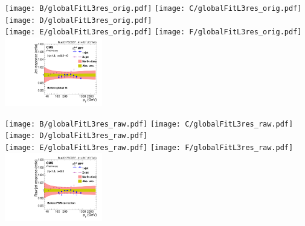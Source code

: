 \documentclass[landscape,10pt]{beamer} %
\begin{document}
\newpage

\texttt{[image: B/globalFitL3res\_orig.pdf]}
\texttt{[image: C/globalFitL3res\_orig.pdf]}
\texttt{[image: D/globalFitL3res\_orig.pdf]}\\
\texttt{[image: E/globalFitL3res\_orig.pdf]}
\texttt{[image: F/globalFitL3res\_orig.pdf]}
\includegraphics[width=0.32\textwidth]{BCDEF/globalFitL3res_orig.pdf}\\
\newpage

\texttt{[image: B/globalFitL3res\_raw.pdf]}
\texttt{[image: C/globalFitL3res\_raw.pdf]}
\texttt{[image: D/globalFitL3res\_raw.pdf]}\\
\texttt{[image: E/globalFitL3res\_raw.pdf]}
\texttt{[image: F/globalFitL3res\_raw.pdf]}
\includegraphics[width=0.32\textwidth]{BCDEF/globalFitL3res_raw.pdf}\\
\end{document}

